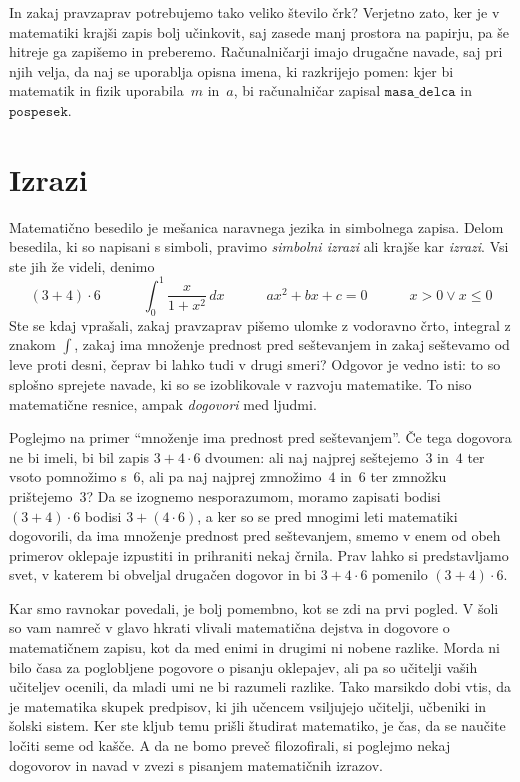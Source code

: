 In zakaj pravzaprav potrebujemo tako veliko število črk? Verjetno zato, ker je v
matematiki krajši zapis bolj učinkovit, saj zasede manj prostora na papirju, pa še hitreje
ga zapišemo in preberemo. Računalničarji imajo drugačne navade, saj pri njih velja, da naj
se uporablja opisna imena, ki razkrijejo pomen: kjer bi matematik in fizik uporabila~$m$
in~$a$, bi računalničar zapisal $\mathtt{masa\_delca}$ in $\texttt{pospesek}$.

\section{Izrazi}
\label{sec:irazi}

Matematično besedilo je mešanica naravnega jezika in simbolnega zapisa. Delom besedila, ki
so napisani s simboli, pravimo \emph{simbolni izrazi} ali krajše kar \emph{izrazi}. Vsi
ste jih že videli, denimo
%
\begin{equation*}
  (3 + 4) \cdot 6 \qquad\quad
  \int_0^1 \frac{x}{1 + x^2} \, dx \qquad\quad
  a x^2 + b x + c = 0 \qquad\quad
  x > 0 \lor x \leq 0
\end{equation*}
%
Ste se kdaj vprašali, zakaj pravzaprav pišemo ulomke z vodoravno črto, integral z znakom
$\int$, zakaj ima množenje prednost pred seštevanjem in zakaj seštevamo od leve proti
desni, čeprav bi lahko tudi v drugi smeri? Odgovor je vedno isti: to so splošno sprejete
navade, ki so se izoblikovale v razvoju matematike. To niso matematične resnice, ampak
\emph{dogovori} med ljudmi. 

Poglejmo na primer ``množenje ima prednost pred seštevanjem''. Če tega dogovora ne bi
imeli, bi bil zapis $3 + 4 \cdot 6$ dvoumen: ali naj najprej seštejemo~$3$ in~$4$ ter
vsoto pomnožimo s~$6$, ali pa naj najprej zmnožimo~$4$ in~$6$ ter zmnožku prištejemo~$3$?
Da se izognemo nesporazumom, moramo zapisati bodisi $(3 + 4) \cdot 6$ bodisi
$3 + (4 \cdot 6)$, a ker so se pred mnogimi leti matematiki dogovorili, da ima množenje
prednost pred seštevanjem, smemo v enem od obeh primerov oklepaje izpustiti in prihraniti
nekaj črnila. Prav lahko si predstavljamo svet, v katerem bi obveljal drugačen dogovor in
bi $3 + 4 \cdot 6$ pomenilo $(3 + 4) \cdot 6$.

%
Kar smo ravnokar povedali, je bolj pomembno, kot se zdi na prvi pogled. V šoli so vam
namreč v glavo hkrati vlivali matematična dejstva in dogovore o matematičnem zapisu, kot
da med enimi in drugimi ni nobene razlike. Morda ni bilo časa za poglobljene pogovore o
pisanju oklepajev, ali pa so učitelji vaših učiteljev ocenili, da mladi umi ne bi razumeli
razlike. Tako marsikdo dobi vtis, da je matematika skupek predpisov, ki jih učencem
vsiljujejo učitelji, učbeniki in šolski sistem. Ker ste kljub temu prišli študirat
matematiko, je čas, da se naučite ločiti seme od kašče. A da ne bomo preveč filozofirali,
si poglejmo nekaj dogovorov in navad v zvezi s pisanjem matematičnih izrazov.


